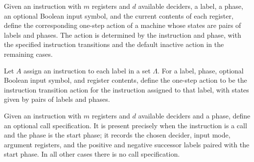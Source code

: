 \begin{definition}
\label{Complexity.LogProg.insTr}
\leanok
{}
Given an instruction with $m$ registers and $d$ available deciders, a label, a phase, an
optional Boolean input symbol, and the current contents of each register, define the
corresponding one-step action of a machine whose states are pairs of labels and phases.
The action is determined by the instruction and phase, with the specified instruction
transitions and the default inactive action in the remaining cases.
\end{definition}

\begin{definition}
\label{Complexity.LogProg.armTr}
\leanok
{}
Let $A$ assign an instruction to each label in a set $\Lambda$. For a label, phase,
optional Boolean input symbol, and register contents, define the one-step action to be
the instruction transition action for the instruction assigned to that label, with
states given by pairs of labels and phases.
\end{definition}

\begin{definition}
\label{Complexity.LogProg.insCall}
\leanok
{}
Given an instruction with $m$ registers and $d$ available deciders and a phase, define
an optional call specification. It is present precisely when the instruction is a call
and the phase is the start phase; it records the chosen decider, input mode, argument
registers, and the positive and negative successor labels paired with the start phase.
In all other cases there is no call specification.
\end{definition}

